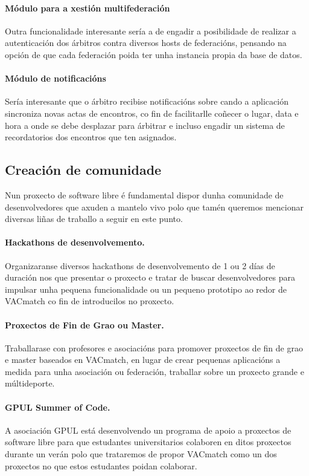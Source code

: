     \paragraph{Módulo para a xestión multifederación} Outra funcionalidade 
interesante sería a de engadir a posibilidade de realizar a autenticación dos 
árbitros contra diversos hosts de federacións, pensando na opción de que cada 
federación poida ter unha instancia propia da base de datos.

    \paragraph{Módulo de notificacións} Sería interesante que o árbitro 
recibise notificacións sobre cando a aplicación sincroniza novas actas de 
encontros, co fin de facilitarlle coñecer o lugar, data e hora a onde se debe 
desplazar para árbitrar e incluso engadir un sistema de recordatorios dos 
encontros que ten asignados.

  \subsection{Creación de comunidade}
  Nun proxecto de software libre é fundamental dispor dunha comunidade de 
desenvolvedores que axuden a mantelo vivo polo que tamén queremos mencionar 
diversas liñas de traballo a seguir en este punto.

    \paragraph{Hackathons de desenvolvemento.} Organizaranse diversos 
hackathons de desenvolvemento de 1 ou 2 días de duración nos que presentar o 
proxecto e tratar de buscar desenvolvedores para impulsar unha pequena 
funcionalidade ou un pequeno prototipo ao redor de VACmatch co fin de 
introducilos no proxecto.

    \paragraph{Proxectos de Fin de Grao ou Master.} Traballarase con profesores 
e asociacións para promover proxectos de fin de grao e master baseados en 
VACmatch, en lugar de crear pequenas aplicacións a medida para unha asociación 
ou federación, traballar sobre un proxecto grande e múltideporte.

    \paragraph{GPUL Summer of Code.} A asociación GPUL está desenvolvendo un 
programa de apoio a proxectos de software libre para que estudantes 
universitarios colaboren en ditos proxectos durante un verán polo que trataremos 
de propor VACmatch como un dos proxectos no que estos estudantes poidan 
colaborar.

